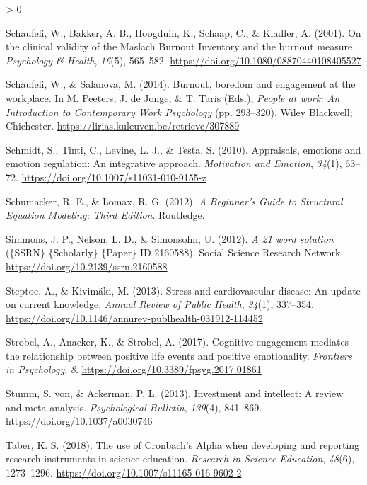 \documentclass[
  english,
  man,floatsintext]{apa6}
\newlength{\cslhangindent}
\newenvironment{CSLReferences}[2] %
 {%
  \setlength{\parindent}{0pt}
  \ifodd #1 \everypar{\setlength{\hangindent}{\cslhangindent}}\ignorespaces\fi
  \ifnum #2 > 0
  \setlength{\parskip}{#2\baselineskip}
  \fi
 }%
 {}
\begin{document}
\begin{CSLReferences}{1}{0}
\leavevmode\hypertarget{ref-Schaufeli2001}{}%
Schaufeli, W., Bakker, A. B., Hoogduin, K., Schaap, C., \& Kladler, A. (2001). On the clinical validity of the {Maslach} {Burnout} {Inventory} and the burnout measure. \emph{Psychology \& Health}, \emph{16}(5), 565--582. \url{https://doi.org/10.1080/08870440108405527}

\leavevmode\hypertarget{ref-Schaufeli2014}{}%
Schaufeli, W., \& Salanova, M. (2014). Burnout, boredom and engagement at the workplace. In M. Peeters, J. de Jonge, \& T. Taris (Eds.), \emph{People at work: {An} {Introduction} to {Contemporary} {Work} {Psychology}} (pp. 293--320). Wiley Blackwell; Chichester. \url{https://lirias.kuleuven.be/retrieve/307889}

\leavevmode\hypertarget{ref-Schmidt2010}{}%
Schmidt, S., Tinti, C., Levine, L. J., \& Testa, S. (2010). Appraisals, emotions and emotion regulation: An integrative approach. \emph{Motivation and Emotion}, \emph{34}(1), 63--72. \url{https://doi.org/10.1007/s11031-010-9155-z}

\leavevmode\hypertarget{ref-Schumacker2012}{}%
Schumacker, R. E., \& Lomax, R. G. (2012). \emph{A {Beginner}'s {Guide} to {Structural} {Equation} {Modeling}: {Third} {Edition}}. Routledge.

\leavevmode\hypertarget{ref-Simmons2012}{}%
Simmons, J. P., Nelson, L. D., \& Simonsohn, U. (2012). \emph{A 21 word solution} (\{SSRN\} \{Scholarly\} \{Paper\} ID 2160588). Social Science Research Network. \url{https://doi.org/10.2139/ssrn.2160588}

\leavevmode\hypertarget{ref-Steptoe2013}{}%
Steptoe, A., \& Kivimäki, M. (2013). Stress and cardiovascular disease: An update on current knowledge. \emph{Annual Review of Public Health}, \emph{34}(1), 337--354. \url{https://doi.org/10.1146/annurev-publhealth-031912-114452}

\leavevmode\hypertarget{ref-Strobel2017}{}%
Strobel, A., Anacker, K., \& Strobel, A. (2017). Cognitive engagement mediates the relationship between positive life events and positive emotionality. \emph{Frontiers in Psychology}, \emph{8}. \url{https://doi.org/10.3389/fpsyg.2017.01861}

\leavevmode\hypertarget{ref-Stumm2013}{}%
Stumm, S. von, \& Ackerman, P. L. (2013). Investment and intellect: A review and meta-analysis. \emph{Psychological Bulletin}, \emph{139}(4), 841--869. \url{https://doi.org/10.1037/a0030746}

\leavevmode\hypertarget{ref-Taber2018}{}%
Taber, K. S. (2018). The use of {Cronbach}'s {Alpha} when developing and reporting research instruments in science education. \emph{Research in Science Education}, \emph{48}(6), 1273--1296. \url{https://doi.org/10.1007/s11165-016-9602-2}


\end{CSLReferences}
\end{document}
